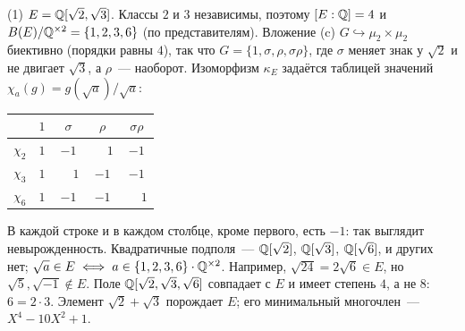 \begin{example}
(1) $E=\mathbb Q[\sqrt2,\sqrt3]$. Классы $2$ и $3$ независимы, поэтому $[E:\mathbb Q]=4$ и $B(E)/\mathbb Q^{\times2}=\{1,2,3,6\}$ (по
представителям). Вложение (c) $G\hookrightarrow\mu_2\times\mu_2$ биективно (порядки равны $4$), так что
$G=\{1,\sigma,\rho,\sigma\rho\}$, где $\sigma$ меняет знак у $\sqrt2$ и не двигает $\sqrt3$, а $\rho$~--- наоборот.
Изоморфизм $\kappa_E$ задаётся таблицей значений $\chi_a(g)=g(\sqrt a)/\sqrt a$:
\begin{center}
\begin{tabular}{c|cccc}
 & $1$ & $\sigma$ & $\rho$ & $\sigma\rho$\\\hline
$\chi_2$ & $1$ & $-1$ & $\phantom-1$ & $-1$\\
$\chi_3$ & $1$ & $\phantom-1$ & $-1$ & $-1$\\
$\chi_6$ & $1$ & $-1$ & $-1$ & $\phantom-1$
\end{tabular}
\end{center}
В каждой строке и в каждом столбце, кроме первого, есть $-1$: так выглядит невырожденность. Квадратичные подполя~---
$\mathbb Q[\sqrt2]$, $\mathbb Q[\sqrt3]$, $\mathbb Q[\sqrt6]$, и других нет; $\sqrt a\in E\iff a\in\{1,2,3,6\}\cdot\mathbb Q^{\times2}$. Например,
$\sqrt{24}=2\sqrt6\in E$, но $\sqrt5,\sqrt{-1}\notin E$. Поле $\mathbb Q[\sqrt2,\sqrt3,\sqrt6]$ совпадает с $E$ и имеет степень
$4$, а не $8$: $6=2\cdot3$. Элемент $\sqrt2+\sqrt3$ порождает $E$; его минимальный многочлен~--- $X^4-10X^2+1$.

\begin{keepfig}
\begin{center}
\end{center}
\end{keepfig}


\end{example}
